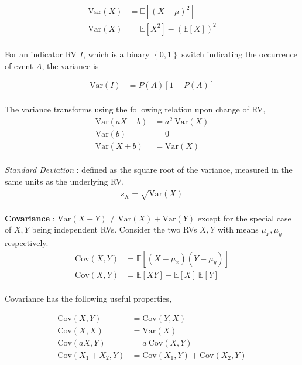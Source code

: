 \begin{align}
	\mathrm{Var}(X) &= \mathbb{E}[(X - \mu)^2] \\
	\mathrm{Var}(X) &= \mathbb{E}[X^2] - (\mathbb{E}[X])^2
\end{align} \\

For an indicator RV $ I $, which is a binary $ \left\{0, 1\right\} $ switch indicating the occurrence of event $ A $, the variance is 

\begin{align}
	\mathrm{Var}(I) &= P(A) [1 - P(A)]
\end{align} \\

The variance transforms using the following relation upon change of RV, 
\begin{align}
	\mathrm{Var}(aX + b) &= a^2 \ \mathrm{Var}(X) \\
	\mathrm{Var}(b) &= 0 \\
	\mathrm{Var}(X + b) &= \mathrm{Var}(X)
\end{align} \\

\textit{Standard Deviation} : defined as the square root of the variance, measured in the same units as the underlying RV. 
\begin{align}
	s_X = \sqrt{\mathrm{Var}(X)}
\end{align} \\

\textbf{Covariance} : $ \mathrm{Var}(X + Y) \neq \mathrm{Var}(X) + \mathrm{Var}(Y) $ except for the special case of $ X, Y $ being independent RVs. Consider the two RVs $ X, Y $ with means $ \mu_x , \mu_y$ respectively. \\

\begin{align}
	\mathrm{Cov}(X, Y) &= \mathbb{E}[(X - \mu_x)(Y - \mu_y)] \\
	\mathrm{Cov}(X, Y) &= \mathbb{E}[XY] - \mathbb{E}[X] \ \mathbb{E}[Y]
\end{align} \\

Covariance has the following useful properties, 

\begin{align}
	\mathrm{Cov}(X, Y) &= \mathrm{Cov}(Y, X) \\
	\mathrm{Cov}(X, X) &= \mathrm{Var}(X) \\
	\mathrm{Cov}(aX, Y) &= a \ \mathrm{Cov}(X, Y) \\
	\mathrm{Cov}(X_1 + X_2, Y) &= \mathrm{Cov}(X_1, Y) + \mathrm{Cov}(X_2, Y)
\end{align} \\

